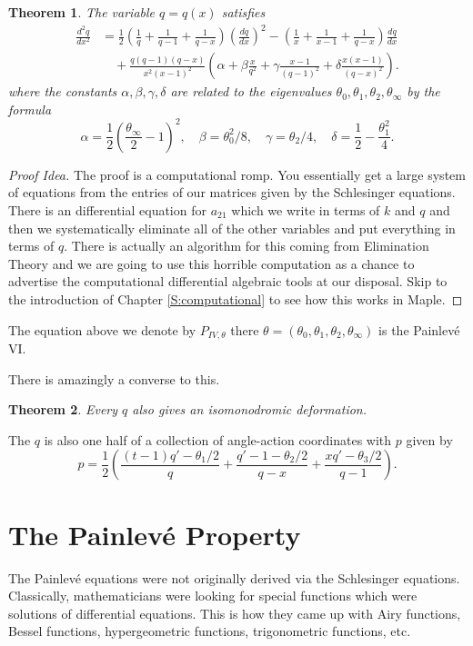\documentclass[12pt]{book}
\numberwithin{equation}{section}
\newtheorem{theorem}{Theorem}[subsection]
\theoremstyle{definition}
\theoremstyle{remark}
\begin{document}
\begin{theorem}
	The variable $q =q(x)$ satisfies 
	\begin{align*}\frac{d^2q}{dx^2}&=
	\frac{1}{2}\left(\frac{1}{q}+\frac{1}{q-1}+\frac{1}{q-x}\right)\left( \frac{dq}{dx} \right)^2
	-\left(\frac{1}{x}+\frac{1}{x-1}+\frac{1}{q-x}\right)\frac{dq}{dx} \\&\quad +
	\frac{q(q-1)(q-x)}{x^2(x-1)^2}
	\left(\alpha+\beta\frac{x}{q^2}+\gamma\frac{x-1}{(q-1)^2}+\delta\frac{x(x-1)}{(q-x)^2}\right).
	\end{align*}
	where the constants $\alpha,\beta,\gamma,\delta$ are related to the eigenvalues $\theta_0,\theta_1,\theta_2,\theta_{\infty}$ by the formula
	$$ \alpha = \frac{1}{2}\left( \frac{\theta_{\infty}}{2}- 1 \right)^2, \quad \beta = \theta_0^2/8, \quad \gamma = \theta_2/4, \quad \delta = \frac{1}{2}-\frac{\theta_1^2}{4}.$$
\end{theorem}
\begin{proof}[Proof Idea]
	The proof is a computational romp. 
	You essentially get a large system of equations from the entries of our matrices given by the Schlesinger equations.
	There is an differential equation for $a_{21}$ which we write in terms of $k$ and $q$ and then we systematically eliminate all of the other variables and put everything in terms of $q$. 
	There is actually an algorithm for this coming from Elimination Theory and we are going to use this horrible computation as a chance to advertise the computational differential algebraic tools at our disposal.
	Skip to the introduction of Chapter \ref{S:computational} to see how this works in \textsf{Maple}.
\end{proof}
The equation above we denote by $P_{IV,\theta}$ there $\theta=(\theta_0,\theta_1,\theta_2,\theta_{\infty})$ is the Painlev\'e VI.

There is amazingly a converse to this. 
\begin{theorem}
Every $q$ also gives an isomonodromic deformation.
\end{theorem}

The $q$ is also one half of a collection of angle-action coordinates with $p$ given by 
$$ p = \frac{1}{2}\left( \frac{(t-1)q'-\theta_1/2}{q} + \frac{q'-1-\theta_2/2}{q-x} + \frac{xq'-\theta_3/2}{q-1} \right). $$




\section{The Painlev\'e Property}
The Painlev\'e equations were not originally derived via the Schlesinger equations. 
Classically, mathematicians were looking for special functions which were solutions of differential equations.
This is how they came up with Airy functions, Bessel functions, hypergeometric functions, trigonometric functions, etc.
\end{document}

